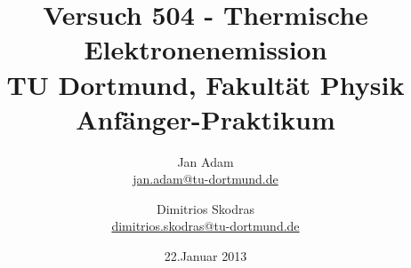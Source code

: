 





\title{Versuch 504 - Thermische Elektronenemission\\				%
\large TU Dortmund, Fakultät Physik\\ 
\normalsize Anfänger-Praktikum}

\author{Jan Adam\\			%
{\small \href{jan.adam@tu-dortmund.de}{jan.adam@tu-dortmund.de}}	%
\and						%
Dimitrios Skodras\\					%
{\small \href{dimitrios.skodras@tu-dortmund.de}{dimitrios.skodras@tu-dortmund.de}}		%
}
\date{22.Januar 2013}				%





\maketitle					%
\thispagestyle{empty} 				%



\tableofcontents


\newpage					%


